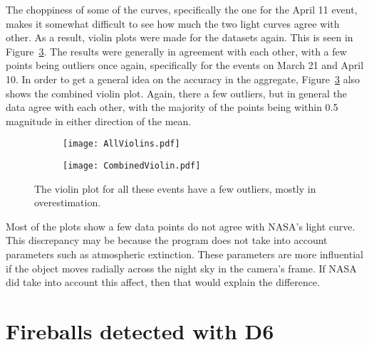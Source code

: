 The choppiness of some of the curves, specifically the one for the April 11 event, makes it somewhat difficult to see how much the two light curves agree with other. As a result, violin plots were made for the datasets again. This is seen in Figure~\ref{fig:twoviolin}. The results were generally in agreement with each other, with a few points being outliers once again, specifically for the events on March 21 and April 10. In order to get a general idea on the accuracy in the aggregate, Figure~\ref{fig:twoviolin} also shows the combined violin plot. Again, there a few outliers, but in general the data agree with each other, with the majority of the points being within 0.5 magnitude in either direction of the mean.
\begin{figure}[ht!]
\centering
\begin{subfigure}{.5\textwidth}
	\centering
	\texttt{[image: AllViolins.pdf]}
	\label{fig:AllViolins}
\end{subfigure}%
\begin{subfigure}{.5\textwidth}
	\centering
	\texttt{[image: CombinedViolin.pdf]}
	\label{fig:CombinedViolin}
\end{subfigure}
\caption{The violin plot for all these events have a few outliers, mostly in overestimation.}
\label{fig:twoviolin}
\end{figure}


Most of the plots show a few data points do not agree with NASA's light curve. This discrepancy may be because the program does not take into account parameters such as atmospheric extinction. These parameters are more influential if the object moves radially across the night sky in the camera's frame. If NASA did take into account this affect, then that would explain the difference. 

\section{Fireballs detected with D6}

